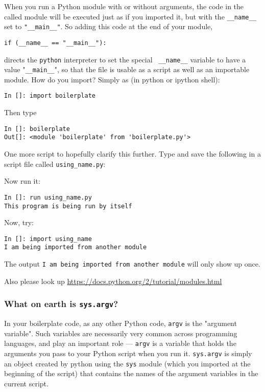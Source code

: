 When you run a Python module with or without arguments, the code in the 
called module will be executed just as if you imported it, but with the 
{\tt \_\_name\_\_} set to {\tt "\_\_main\_\_"}. So adding this code 
at the end of your module,
\begin{lstlisting}
if (__name__ == "__main__"):
\end{lstlisting}
directs the {\tt python} interpreter to set the special {\tt 
\_\_name\_\_} variable to have a value "{\tt  \_\_main\_\_}", so that 
the file is usable as a script as well as an importable module. How do 
you import? Simply as (in python or ipython shell):
\begin{lstlisting}
In []: import boilerplate
\end{lstlisting}
Then type 
\begin{lstlisting}
In []: boilerplate
Out[]: <module 'boilerplate' from 'boilerplate.py'>
\end{lstlisting}

One more script to hopefully clarify this further. Type and save the 
following in a script file called {\tt using\_name.py}: 

Now run it:
\begin{lstlisting}
In []: run using_name.py
This program is being run by itself
\end{lstlisting}

Now, try:
\begin{lstlisting}
In []: import using_name
I am being imported from another module
\end{lstlisting}
	
The output {\tt I am being imported from another module} will only 
show up once. 

Also please look up \url{https://docs.python.org/2/tutorial/modules.html}

\subsubsection{What on earth is {\tt sys.argv}?}

In your boilerplate code, as any other Python code, {\tt argv} is the 
"argument variable". Such variables are necessarily very common across 
programming languages, and play an important role --- {\tt argv} is a 
variable that holds the arguments you pass to your Python script when 
you run it. {\tt sys.argv} is simply an object created by python 
using the {\tt sys} module (which you imported at the beginning of the 
script) that contains the names of the argument variables in the 
current script.


